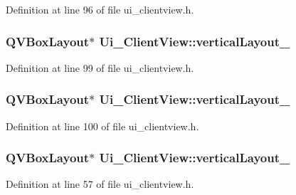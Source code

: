 Definition at line 96 of file ui\+\_\+clientview.\+h.

\hypertarget{class_ui___client_view_a02f1b48679f4d1580d96394b42a95501}{}
\subsubsection[{vertical\+Layout\+\_\+12}]{\setlength{\rightskip}{0pt plus 5cm}Q\+V\+Box\+Layout$\ast$ Ui\+\_\+\+Client\+View\+::vertical\+Layout\+\_}\label{class_ui___client_view_a02f1b48679f4d1580d96394b42a95501}


Definition at line 99 of file ui\+\_\+clientview.\+h.

\hypertarget{class_ui___client_view_a91d4597c0f391143550599e92f58da46}{}
\subsubsection[{vertical\+Layout\+\_\+13}]{\setlength{\rightskip}{0pt plus 5cm}Q\+V\+Box\+Layout$\ast$ Ui\+\_\+\+Client\+View\+::vertical\+Layout\+\_}\label{class_ui___client_view_a91d4597c0f391143550599e92f58da46}


Definition at line 100 of file ui\+\_\+clientview.\+h.

\hypertarget{class_ui___client_view_ade7bb455e23aaeda36596c246f357459}{}
\subsubsection[{vertical\+Layout\+\_\+2}]{\setlength{\rightskip}{0pt plus 5cm}Q\+V\+Box\+Layout$\ast$ Ui\+\_\+\+Client\+View\+::vertical\+Layout\+\_}\label{class_ui___client_view_ade7bb455e23aaeda36596c246f357459}


Definition at line 57 of file ui\+\_\+clientview.\+h.

\hypertarget{class_ui___client_view_a3b7c797d484375f1404408e0fcf7d50b}{}
